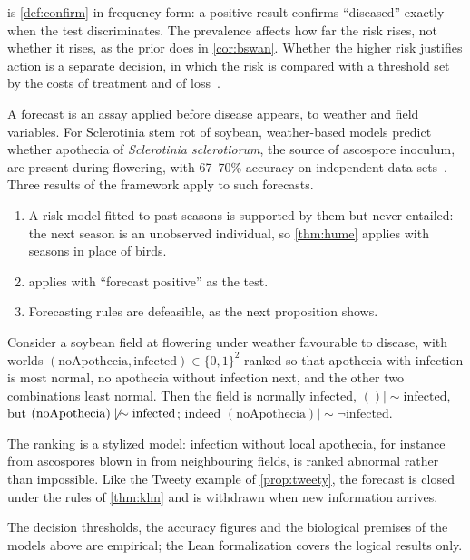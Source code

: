  is \cref{def:confirm} in frequency form: a positive result confirms
``diseased'' exactly when the test discriminates. The prevalence affects how far the risk rises,
not whether it rises, as the prior does in \cref{cor:bswan}. Whether the higher risk justifies
action is a separate decision, in which the risk is compared with a threshold set by the costs of
treatment and of loss~\cite{hughes1999,madden2007}.

A forecast is an assay applied before disease appears, to weather and field variables. For
Sclerotinia stem rot of soybean, weather-based models predict whether apothecia of
\emph{Sclerotinia sclerotiorum}, the source of ascospore inoculum, are present during flowering,
with 67--70\% accuracy on independent data sets~\cite{willbur2018}. Three results of the framework
apply to such forecasts.
\begin{enumerate}
  \item A risk model fitted to past seasons is supported by them but never entailed: the next
        season is an unobserved individual, so \cref{thm:hume} applies with seasons in place of
        birds.
  \item {} applies with ``forecast positive'' as the test.
  \item Forecasting rules are defeasible, as the next proposition shows.
\end{enumerate}

\begin{proposition}\label{prop:sclerotinia}
Consider a soybean field at flowering under weather favourable to disease, with worlds
$(\mathrm{noApothecia},\mathrm{infected})\in\{0,1\}^2$ ranked so that apothecia with infection
is most normal, no apothecia without infection next, and the other two combinations least normal.
Then the field is normally infected, $()\mathrel{|\!\sim}\mathrm{infected}$, but
$(\mathrm{noApothecia})\not\mathrel{|\!\sim}\mathrm{infected}$; indeed
$(\mathrm{noApothecia})\mathrel{|\!\sim}\neg\mathrm{infected}$.
\end{proposition}

The ranking is a stylized model: infection without local apothecia, for instance from ascospores
blown in from neighbouring fields, is ranked abnormal rather than impossible. Like the Tweety
example of \cref{prop:tweety}, the forecast is closed under the rules of \cref{thm:klm} and is
withdrawn when new information arrives.

The decision thresholds, the accuracy figures and the biological premises of the models above are
empirical; the Lean formalization covers the logical results only.
